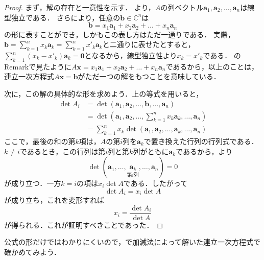 \begin{tleftbar}
\begin{proof}
  まず，解の存在と一意性を示す．
  より，$A$の列ベクトル$\bm{a}_1, \bm{a}_2, \dots, \bm{a}_n$は線型独立である．
  さらにより，任意の$\bm{b} \in \mathbb{C}^n$は
  \[
   \bm{b}= x_1 \bm{a}_1+x_2 \bm{a}_2+\dots + x_n \bm{a}_n
  \]
  の形に表すことができ，しかもこの表し方はただ一通りである．
  実際，$\bm{b} = \sum_{k=1}^{n} x_k \bm{a}_k = \sum_{k=1}^{n} x'_k \bm{a}_k$と二通りに表せたとすると，$\sum_{k=1}^{n} (x_k - x'_k) \bm{a}_k = \bm{0}$となるから，線型独立性より$x_k = x'_k$である．
  のRemarkで見たように$A\bm{x} = x_1 \bm{a}_1 + x_2 \bm{a}_2 + \dots + x_n \bm{a}_n$であるから，以上のことは，連立一次方程式$A\bm{x} = \bm{b}$がただ一つの解をもつことを意味している．

  次に，この解の具体的な形を求めよう．上の等式を用いると，
  \begin{align*}
  \det A_i & = \det (\bm{a}_1,\bm{a}_2,\dots,\bm{b},\dots,\bm{a}_n) \\
  & = \det (\bm{a}_1,\bm{a}_2,\dots, \sum_{k=1}^n x_k \bm{a}_k ,\dots,\bm{a}_n) \\
  & = \sum_{k=1}^n x_k \det (\bm{a}_1,\bm{a}_2,\dots, \bm{a}_k ,\dots,\bm{a}_n) 
  \end{align*}
  ここで，最後の和の第$k$項は，$A$の第$i$列を$\bm{a}_k$で置き換えた行列の行列式である．
  $k \ne i$であるとき，この行列は第$i$列と第$k$列がともに$\bm{a}_k$であるから，より
  \[
  \det (\bm{a}_1,\dots, \underset{\text{第$i$列}}{\bm{a}_k} ,\dots,\bm{a}_n) = 0
  \]
  が成り立つ．一方$k = i$の項は$x_i \det A$である．したがって
  \[
  \det A_i = x_i \det A
  \]
  が成り立ち，これを変形すれば
  \[
  x_i = \frac{\det A_i}{\det A}
  \]
  が得られる．これが証明すべきことであった．
\end{proof}
\end{tleftbar}

公式の形だけではわかりにくいので，で加減法によって解いた連立一次方程式で確かめてみよう．

